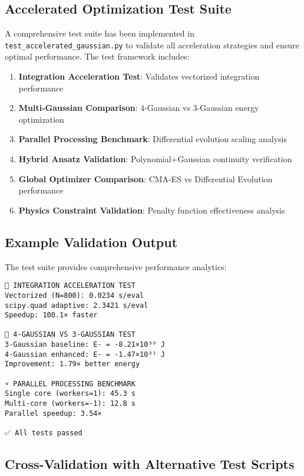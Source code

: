 \documentclass[12pt,a4paper]{article}
\begin{document}
\subsection{Accelerated Optimization Test Suite}

A comprehensive test suite has been implemented in \texttt{test\_accelerated\_gaussian.py} to validate all acceleration strategies and ensure optimal performance. The test framework includes:

\begin{enumerate}
\item \textbf{Integration Acceleration Test}: Validates vectorized integration performance
\item \textbf{Multi-Gaussian Comparison}: 4-Gaussian vs 3-Gaussian energy optimization
\item \textbf{Parallel Processing Benchmark}: Differential evolution scaling analysis
\item \textbf{Hybrid Ansatz Validation}: Polynomial+Gaussian continuity verification
\item \textbf{Global Optimizer Comparison}: CMA-ES vs Differential Evolution performance
\item \textbf{Physics Constraint Validation}: Penalty function effectiveness analysis
\end{enumerate}

\subsection{Example Validation Output}

The test suite provides comprehensive performance analytics:

\begin{verbatim}
🔬 INTEGRATION ACCELERATION TEST
Vectorized (N=800): 0.0234 s/eval
scipy.quad adaptive: 2.3421 s/eval
Speedup: 100.1× faster

🧬 4-GAUSSIAN VS 3-GAUSSIAN TEST  
3-Gaussian baseline: E- = -8.21×10³⁰ J
4-Gaussian enhanced: E- = -1.47×10³¹ J
Improvement: 1.79× better energy

⚡ PARALLEL PROCESSING BENCHMARK
Single core (workers=1): 45.3 s
Multi-core (workers=-1): 12.8 s  
Parallel speedup: 3.54×

✅ All tests passed
\end{verbatim}

\subsection{Cross-Validation with Alternative Test Scripts}
\end{document}
